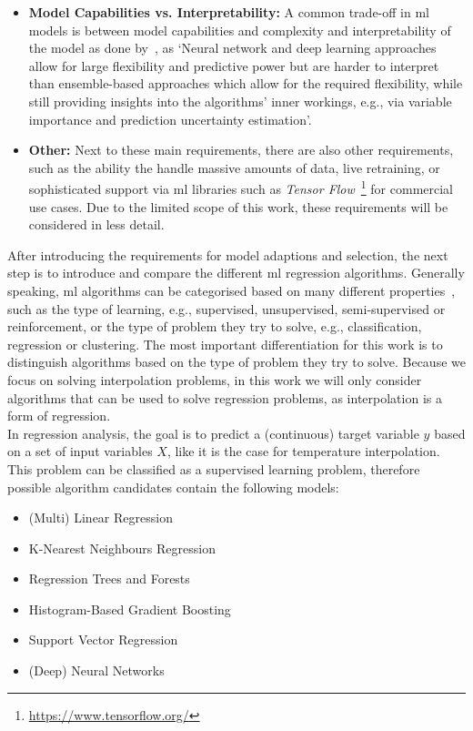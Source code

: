 \begin{itemize}
    \item \textbf{Model Capabilities vs. Interpretability:} A common trade-off in \gls{ml} models is between model capabilities and complexity and interpretability of the model as done by~\cite{zumwald2021mapping}, as `Neural network and deep learning approaches allow for large flexibility and predictive power but are harder to interpret than ensemble-based approaches which allow for the required flexibility, while still providing insights into the algorithms' inner workings, e.g., via variable importance and prediction uncertainty estimation'.
    \item \textbf{Other:} Next to these main requirements, there are also other requirements, such as the ability the handle massive amounts of data, live retraining, or sophisticated support via \gls{ml} libraries such as \textit{Tensor Flow}~\footnote{\url{https://www.tensorflow.org/}} for commercial use cases. Due to the limited scope of this work, these requirements will be considered in less detail.
\end{itemize}

After introducing the requirements for model adaptions and selection, the next step is to introduce and compare the different \gls{ml} regression algorithms.
Generally speaking, \gls{ml} algorithms can be categorised based on many different properties~\cite{sarker2021machine}, such as the type of learning, e.g., supervised, unsupervised, semi-supervised or reinforcement, or the type of problem they try to solve, e.g., classification, regression or clustering. The most important differentiation for this work is to distinguish algorithms based on the type of problem they try to solve. Because we focus on solving interpolation problems, in this work we will only consider algorithms that can be used to solve regression problems, as interpolation is a form of regression.\\
In regression analysis, the goal is to predict a (continuous) target variable $y$ based on a set of input variables $X$, like it is the case for temperature interpolation. This problem can be classified as a supervised learning problem, therefore possible algorithm candidates contain the following models:

\begin{itemize}
    \item (Multi) Linear Regression
    \item K-Nearest Neighbours Regression
    \item Regression Trees and Forests
    \item Histogram-Based Gradient Boosting
    \item Support Vector Regression
    \item (Deep) Neural Networks
\end{itemize}

